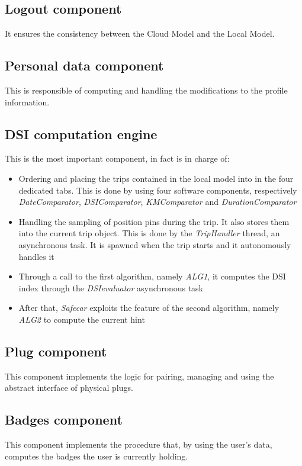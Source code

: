 \subsection{Logout component}
It ensures the consistency between the Cloud Model and the Local Model.

\subsection{Personal data component}
This is responsible of computing and handling the modifications to the profile information.

\subsection{DSI computation engine}
This is the most important component, in fact is in charge of:

\begin{itemize}
	\item Ordering and placing the trips contained in the local model into in the four dedicated tabs. This is done by using four software components, respectively \textit{DateComparator}, \textit{DSIComparator}, \textit{KMComparator} and \textit{DurationComparator}
	\item Handling the sampling of position pins during the trip. It also stores them into the current trip object. This is done by the \textit{TripHandler} thread, an asynchronous task. It is spawned when the trip starts and it autonomously handles it
	\item Through a call to the first algorithm, namely \textit{ALG1}, it computes the DSI index through the \textit{DSIevaluator} asynchronous task
	\item After that, \textit{Safecar} exploits the feature of the second algorithm, namely \textit{ALG2} to compute the current hint
\end{itemize}

\subsection{Plug component}
This component implements the logic for pairing, managing and using the abstract interface of physical plugs.

\subsection{Badges component}
This component implements the procedure that, by using the user's data, computes the badges the user is currently holding.

